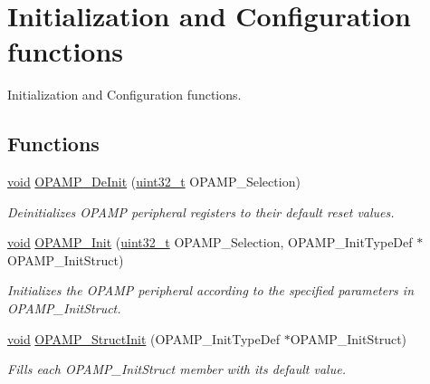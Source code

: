 \hypertarget{group___o_p_a_m_p___group1}{\section{Initialization and Configuration functions}
\label{group___o_p_a_m_p___group1}
}


Initialization and Configuration functions.  


\subsection*{Functions}
\begin{DoxyCompactItemize}
\item 
\hyperlink{group___n_a_m_e_ga18028b8badbf1ea7e704ccac3c488e82}{void} \hyperlink{group___o_p_a_m_p___group1_gaa4bbf6664a065c5d03403a44a2766812}{O\-P\-A\-M\-P\-\_\-\-De\-Init} (\hyperlink{stdint_8h_a435d1572bf3f880d55459d9805097f62}{uint32\-\_\-t} O\-P\-A\-M\-P\-\_\-\-Selection)
\begin{DoxyCompactList}\small\item\em Deinitializes O\-P\-A\-M\-P peripheral registers to their default reset values. \end{DoxyCompactList}\item 
\hyperlink{group___n_a_m_e_ga18028b8badbf1ea7e704ccac3c488e82}{void} \hyperlink{group___o_p_a_m_p___group1_ga09d484350c3bded9efde1e49b94e6ec3}{O\-P\-A\-M\-P\-\_\-\-Init} (\hyperlink{stdint_8h_a435d1572bf3f880d55459d9805097f62}{uint32\-\_\-t} O\-P\-A\-M\-P\-\_\-\-Selection, O\-P\-A\-M\-P\-\_\-\-Init\-Type\-Def $\ast$O\-P\-A\-M\-P\-\_\-\-Init\-Struct)
\begin{DoxyCompactList}\small\item\em Initializes the O\-P\-A\-M\-P peripheral according to the specified parameters in O\-P\-A\-M\-P\-\_\-\-Init\-Struct. \end{DoxyCompactList}\item 
\hyperlink{group___n_a_m_e_ga18028b8badbf1ea7e704ccac3c488e82}{void} \hyperlink{group___o_p_a_m_p___group1_ga15fee15afc081d1e8d5e8bf0f83bbc27}{O\-P\-A\-M\-P\-\_\-\-Struct\-Init} (O\-P\-A\-M\-P\-\_\-\-Init\-Type\-Def $\ast$O\-P\-A\-M\-P\-\_\-\-Init\-Struct)
\begin{DoxyCompactList}\small\item\em Fills each O\-P\-A\-M\-P\-\_\-\-Init\-Struct member with its default value. \end{DoxyCompactList}\item 

\end{DoxyCompactItemize}

